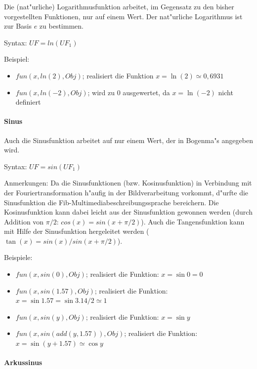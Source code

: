 Die (nat"urliche) Logarithmusfunktion arbeitet, im Gegensatz zu den bisher vorgestellten Funktionen, nur auf einem Wert. Der nat"urliche Logarithmus ist zur Basis $e$ zu bestimmen.

\bigskip\noindent
Syntax:
$UF=ln(UF_1)$

\bigskip\noindent
Beispiel:
\begin{itemize}
 \item $fun(x, ln(2), Obj)$; realisiert die Funktion $x=\ln{(2)} \simeq 0{,}6931$
 \item $fun(x, ln(-2), Obj)$; wird zu $0$ ausgewertet, da $x=\ln{(-2)}$ nicht definiert
\end{itemize}


\paragraph{Sinus}

Auch die Sinusfunktion arbeitet auf nur einem Wert, der in Bogenma"s angegeben wird.

\bigskip\noindent
Syntax:
$UF=sin(UF_1)$

\bigskip\noindent
Anmerkungen:
Da die Sinusfunktionen (bzw. Kosinusfunktion) in Verbindung mit der Fouriertransformation h"aufig in der Bildverarbeitung vorkommt, d"urfte die Sinusfunktion die Fib-Multimediabeschreibungssprache bereichern. Die Kosinusfunktion kann dabei leicht aus der Sinusfunktion gewonnen werden (durch Addition von $\pi/2$: $cos{(x)}=sin{(x+\pi/2)}$). Auch die Tangensfunktion kann mit Hilfe der Sinusfunktion hergeleitet werden ($\tan{(x)}=sin{(x)}/sin{(x+\pi/2)}$).

\bigskip\noindent
Beispiele:
\begin{itemize}
 \item $fun(x, sin(0), Obj)$; realisiert die Funktion: $x=\sin{0}=0$
 \item $fun(x, sin(1.57), Obj)$; realisiert die Funktion: $x=\sin{1.57}=\sin{3.14/2} \simeq 1$
 \item $fun(x, sin(y), Obj)$; realisiert die Funktion: $x=\sin{y}$
 \item $fun(x, sin( add(y, 1.57) ), Obj)$; realisiert die Funktion: $x=\sin{(y + 1.57 )} \simeq \cos{y}$
\end{itemize}


\paragraph{Arkussinus}

